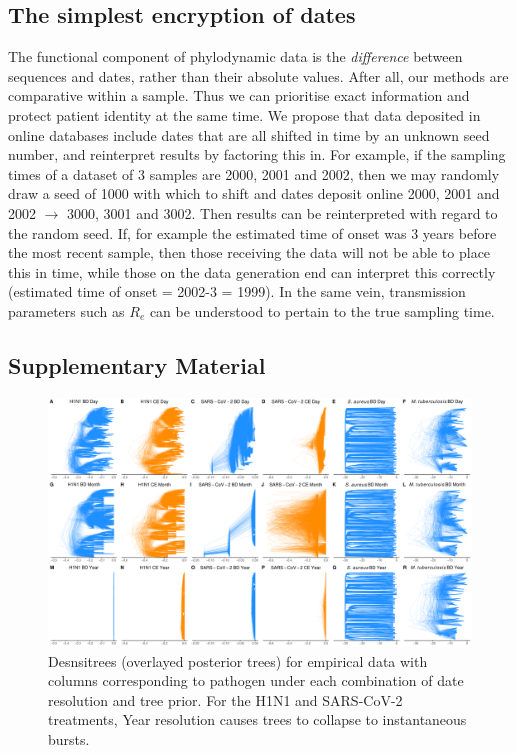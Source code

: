 \documentclass{article}
\begin{document}
\begin{spacing}{1.5}
\subsection*{The simplest encryption of dates}
The functional component of phylodynamic data is the \emph{difference} between sequences and dates, rather than their absolute values. After all, our methods are comparative within a sample. Thus we can prioritise exact information and protect patient identity at the same time. We propose that data deposited in online databases include dates that are all shifted in time by an unknown seed number, and reinterpret results by factoring this in. For example, if the sampling times of a dataset of 3 samples are 2000, 2001 and 2002, then we may randomly draw a seed of 1000 with which to shift and dates deposit online 2000, 2001 and 2002 $\rightarrow$ 3000, 3001 and 3002. Then results can be reinterpreted with regard to the random seed. If, for example the estimated time of onset was 3 years before the most recent sample, then those receiving the data will not be able to place this in time, while those on the data generation end can interpret this correctly (estimated time of onset = 2002-3 = 1999). In the same vein, transmission parameters such as $R_e$ can be understood to pertain to the true sampling time.

\end{spacing}




\subsection*{Supplementary Material}

\renewcommand{\thefigure}{S\arabic{figure}}
\renewcommand{\thetable}{S\arabic{table}}
\setcounter{figure}{0}
\setcounter{table}{0}

\begin{figure}[h!]
    \centering
    \includegraphics[width=\textwidth]{empirical_densitrees.pdf}
    \caption{Desnsitrees (overlayed posterior trees) for empirical data with columns corresponding to pathogen under each combination of date resolution and tree prior. For the H1N1 and SARS-CoV-2 treatments, Year resolution causes trees to collapse to instantaneous bursts.}
    \label{fig:densitree}
\end{figure}
\end{document}
